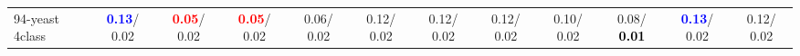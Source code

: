 \begin{table}[h]
\begin{center}
{\begin{tabular}{lc|c|c|c|c|c|c|c|c|c|c}
94-yeast 4class & \textcolor{blue}{\textbf{  0.13}}/  0.02 & \textcolor{red}{\textbf{  0.05}}/  0.02 & \textcolor{red}{\textbf{  0.05}}/  0.02 &   0.06/  0.02 &   0.12/  0.02 &   0.12/  0.02 &   0.12/  0.02 &   0.10/  0.02 &   0.08/\textcolor{black}{\textbf{  0.01}} & \textcolor{blue}{\textbf{  0.13}}/  0.02 &   0.12/  0.02 \\\end{tabular}
}\label{strats2bCIELM}
\end{center}
\end{table}